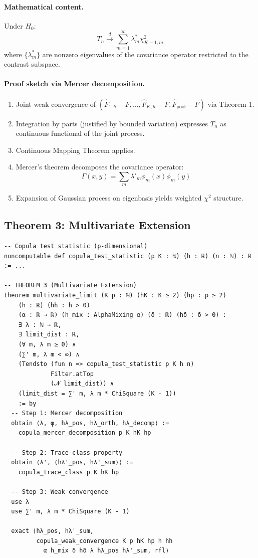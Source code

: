 \documentclass[11pt,a4paper]{article}
\theoremstyle{definition}
\begin{document}
\paragraph{Mathematical content.} Under $H_0$:
\[
T_n \xrightarrow{d} \sum_{m=1}^{\infty} \lambda_m^* \chi^2_{K-1,m}
\]
where $\{\lambda_m^*\}$ are nonzero eigenvalues of the covariance operator restricted to the contrast subspace.

\paragraph{Proof sketch via Mercer decomposition.}
\begin{enumerate}
\item Joint weak convergence of $(\hat{F}_{1,h}-F, \dots, \hat{F}_{K,h}-F, \hat{F}_{\text{pool}}-F)$ via Theorem 1.

\item Integration by parts (justified by bounded variation) expresses $T_n$ as continuous functional of the joint process.

\item Continuous Mapping Theorem applies.

\item Mercer's theorem decomposes the covariance operator:
\[
\Gamma(x,y) = \sum_m \lambda'_m \phi_m(x) \phi_m(y)
\]

\item Expansion of Gaussian process on eigenbasis yields weighted $\chi^2$ structure.
\end{enumerate}

\subsection{Theorem 3: Multivariate Extension}

\begin{lstlisting}[caption={Theorem 3: Multivariate Limit}]
-- Copula test statistic (p-dimensional)
noncomputable def copula_test_statistic (p K : ℕ) (h : ℝ) (n : ℕ) : ℝ := ...

-- THEOREM 3 (Multivariate Extension)
theorem multivariate_limit (K p : ℕ) (hK : K ≥ 2) (hp : p ≥ 2)
    (h : ℝ) (hh : h > 0)
    (α : ℝ → ℝ) (h_mix : AlphaMixing α) (δ : ℝ) (hδ : δ > 0) :
    ∃ λ : ℕ → ℝ,
    ∃ limit_dist : ℝ,
    (∀ m, λ m ≥ 0) ∧
    (∑' m, λ m < ∞) ∧
    (Tendsto (fun n => copula_test_statistic p K h n) 
             Filter.atTop 
             (𝓝 limit_dist)) ∧
    (limit_dist = ∑' m, λ m * ChiSquare (K - 1))
    := by
  -- Step 1: Mercer decomposition
  obtain ⟨λ, φ, hλ_pos, hλ_orth, hλ_decomp⟩ := 
    copula_mercer_decomposition p K hK hp
  
  -- Step 2: Trace-class property
  obtain ⟨λ', ⟨hλ'_pos, hλ'_sum⟩⟩ := 
    copula_trace_class p K hK hp
  
  -- Step 3: Weak convergence
  use λ
  use ∑' m, λ m * ChiSquare (K - 1)
  
  exact ⟨hλ_pos, hλ'_sum, 
         copula_weak_convergence K p hK hp h hh 
           α h_mix δ hδ λ hλ_pos hλ'_sum, rfl⟩
\end{lstlisting}
\end{document}
